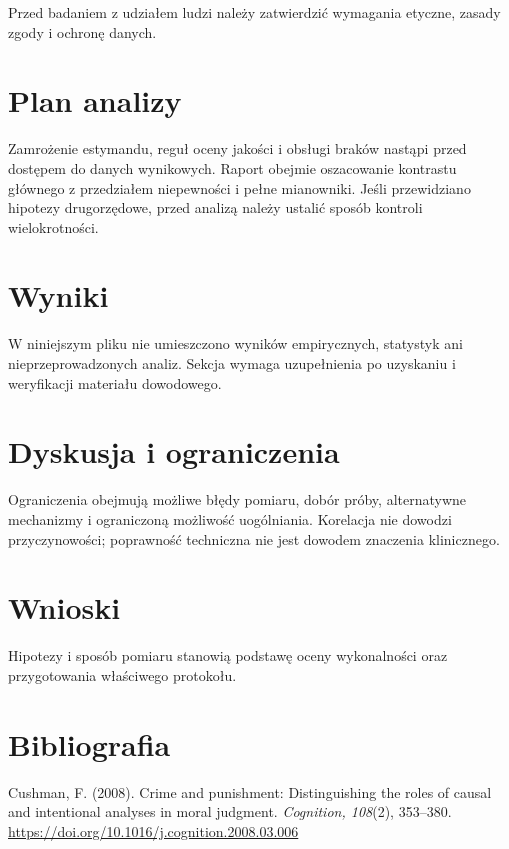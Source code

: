 \documentclass[11pt,a4paper]{article}
\begin{document}
Przed badaniem z udziałem ludzi należy zatwierdzić wymagania etyczne, zasady zgody i ochronę danych.

\section{Plan analizy}

Zamrożenie estymandu, reguł oceny jakości i obsługi braków nastąpi przed dostępem do danych wynikowych. Raport obejmie oszacowanie kontrastu głównego z przedziałem niepewności i pełne mianowniki. Jeśli przewidziano hipotezy drugorzędowe, przed analizą należy ustalić sposób kontroli wielokrotności.

\section{Wyniki}

W niniejszym pliku nie umieszczono wyników empirycznych, statystyk ani nieprzeprowadzonych analiz. Sekcja wymaga uzupełnienia po uzyskaniu i weryfikacji materiału dowodowego.

\section{Dyskusja i ograniczenia}

Ograniczenia obejmują możliwe błędy pomiaru, dobór próby, alternatywne mechanizmy i ograniczoną możliwość uogólniania. Korelacja nie dowodzi przyczynowości; poprawność techniczna nie jest dowodem znaczenia klinicznego.

\section{Wnioski}

Hipotezy i sposób pomiaru stanowią podstawę oceny wykonalności oraz przygotowania właściwego protokołu.

\section*{Bibliografia}

{\setlength{\parindent}{0pt}
\setlength{\parskip}{5pt}
\hangindent=1.27cm
Cushman, F. (2008). Crime and punishment: Distinguishing the roles of causal and intentional analyses in moral judgment. \textit{Cognition, 108}(2), 353--380. \url{https://doi.org/10.1016/j.cognition.2008.03.006}\par
}
\end{document}
